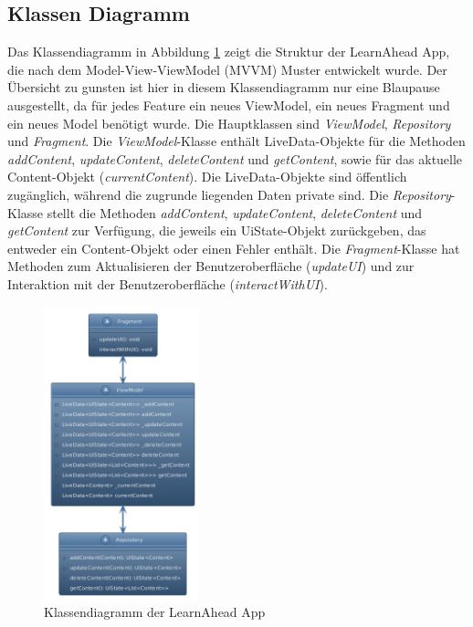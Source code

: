 \subsection{Klassen Diagramm} \label{Klassen Diagramm}
Das Klassendiagramm in Abbildung \ref{fig:klassendiagramm} zeigt die Struktur der LearnAhead App, die nach dem Model-View-ViewModel (MVVM) Muster entwickelt wurde. Der Übersicht zu gunsten ist hier in diesem Klassendiagramm nur eine Blaupause ausgestellt, da für jedes Feature ein neues ViewModel, ein neues Fragment und ein neues Model benötigt wurde.\newline
Die Hauptklassen sind \textit{ViewModel}, \textit{Repository} und \textit{Fragment}. \newline
Die \textit{ViewModel}-Klasse enthält LiveData-Objekte für die Methoden \textit{addContent}, \textit{updateContent}, \textit{deleteContent} und \textit{getContent}, sowie für das aktuelle Content-Objekt (\textit{currentContent}). Die LiveData-Objekte sind öffentlich zugänglich, während die zugrunde liegenden Daten private sind.\newline
Die \textit{Repository}-Klasse stellt die Methoden \textit{addContent}, \textit{updateContent}, \textit{deleteContent} und \textit{getContent} zur Verfügung, die jeweils ein UiState-Objekt zurückgeben, das entweder ein Content-Objekt oder einen Fehler enthält.\newline
Die \textit{Fragment}-Klasse hat Methoden zum Aktualisieren der Benutzeroberfläche (\textit{updateUI}) und zur Interaktion mit der Benutzeroberfläche (\textit{interactWithUI}).\newline
\begin{figure}[h]
\centering
\includegraphics[width=0.4\textwidth]{images/diagramme/Klassendiagramm.png}
\caption{Klassendiagramm der LearnAhead App}
\label{fig:klassendiagramm}
\end{figure} \newpage
